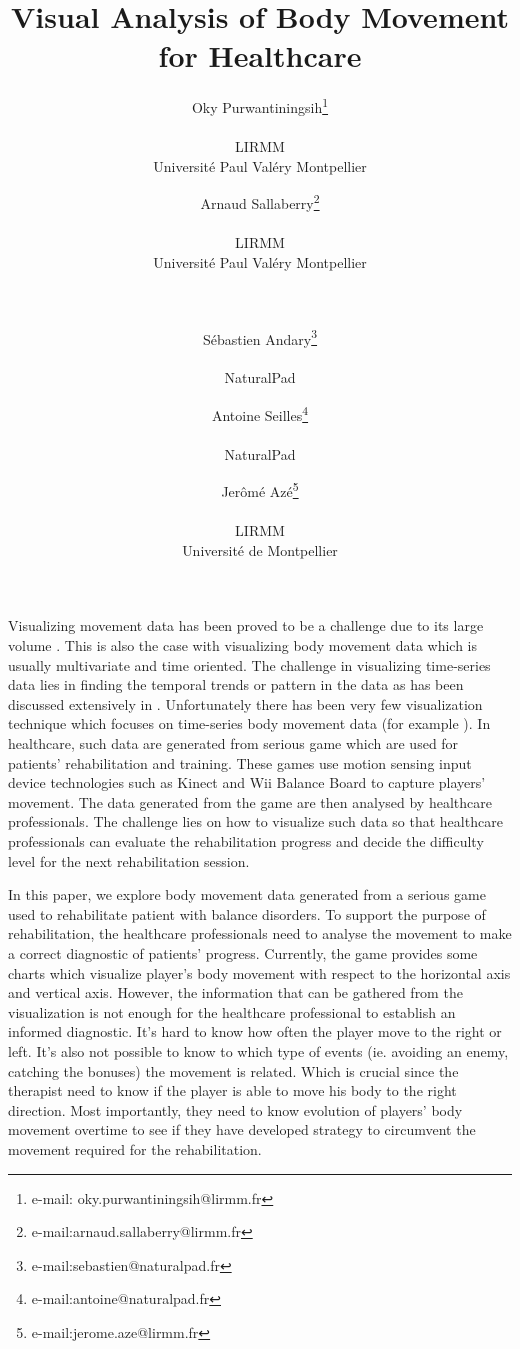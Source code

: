 \documentclass{vgtc}                          %
\title{Visual Analysis of Body Movement for Healthcare}
\author{Oky Purwantiningsih\thanks{e-mail: oky.purwantiningsih@lirmm.fr}\\ %
        \parbox{2in}{\scriptsize \centering LIRMM \\ Universit\'{e} Paul Val\'{e}ry Montpellier} %
\and Arnaud Sallaberry\thanks{e-mail:arnaud.sallaberry@lirmm.fr}\\ %
     \parbox{2in}{\scriptsize \centering LIRMM \\ Universit\'{e} Paul Val\'{e}ry Montpellier} \\  \\ %
\and S\'{e}bastien Andary\thanks{e-mail:sebastien@naturalpad.fr}\\ %
\parbox{2in}{\scriptsize \centering NaturalPad}%
\and Antoine Seilles\thanks{e-mail:antoine@naturalpad.fr}\\ %
\parbox{2in}{\scriptsize \centering NaturalPad}%
\and Jer\^{o}m\'{e} Az\'{e}\thanks{e-mail:jerome.aze@lirmm.fr}\\ %
\parbox{2in}{\scriptsize \centering LIRMM \\ Universit\'{e} de Montpellier} %
	} %
\begin{document}


\maketitle


Visualizing movement data has been proved to be a challenge due to its large volume \cite{adrienko_book}. This is also the case with visualizing body movement data which is usually multivariate and time oriented. The challenge in visualizing time-series data lies in finding the temporal trends or pattern in the data as has been discussed extensively in \cite{aigner}. Unfortunately there has been very few visualization technique which focuses on time-series body movement data (for example \cite{bernard2013}). In healthcare, such data are generated from serious game which are used for patients' rehabilitation and training. These games use motion sensing input device technologies such as Kinect and Wii Balance Board to capture players' movement. The data generated from the game are then analysed by healthcare professionals. The challenge lies on how to visualize such data so that healthcare professionals can evaluate the rehabilitation progress and decide the difficulty level for the next rehabilitation session.

In this paper, we explore body movement data generated from a serious game used to rehabilitate patient with balance disorders. To support the purpose of rehabilitation, the healthcare professionals need to analyse the movement to  make a correct diagnostic of patients' progress. Currently, the game provides some charts which visualize player's body movement with respect to the horizontal axis and vertical axis. However, the information that can be gathered from the visualization is not enough for the healthcare professional to establish an informed diagnostic. It's hard to know how often the player move to the right or left. It's also not possible to know to which type of events (ie. avoiding an enemy, catching the bonuses) the movement is related. Which is crucial since the therapist need to know if the player is able to move his body to the right direction. Most importantly, they need to know evolution of players' body movement overtime to see if they have developed strategy to circumvent the movement required for the rehabilitation.
\end{document}
